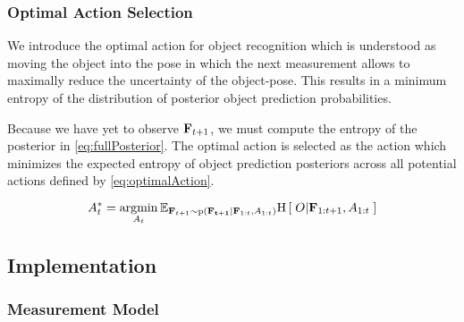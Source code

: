 \subsubsection{Optimal Action Selection}            
            
            We introduce the optimal action for object recognition which is understood as moving the object into the pose in which the next measurement allows to maximally reduce the uncertainty of the object-pose. This results in a minimum entropy of the distribution of posterior object prediction probabilities. 

            Because we have yet to observe $\mathbf{F}_{t+1}$, we must compute the  entropy of the posterior in \eqref{eq:fullPosterior}. The optimal action is selected as the action which minimizes the expected entropy of object prediction posteriors across all potential actions defined by \eqref{eq:optimalAction}.
            
            
            {
            \begin{equation}
            \label{eq:optimalAction}
            \small                
                A_t^* = \argmin_{A_t} \expectedValue{ \entropy{O|\set{F}_{1:t+1},A_{1:t}} }{\set{F}_{t+1} \sim \prob{\set{F_{t+1}}|\set{F}_{1:t},A_{1:t}}}
            \end{equation}
            }
            
            \vspace{-4ex}
    \subsection{Implementation}
        \subsubsection{Measurement Model}

 

